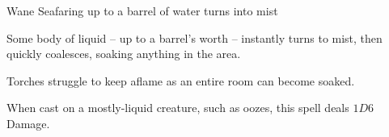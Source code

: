   {\mWater}%
  {Wane}%
  {}%
  {Seafaring}%
  {up to a barrel of water turns into mist}%
  {
    Some body of liquid -- up to a barrel's worth -- instantly turns to mist, then quickly coalesces, soaking anything in the area.

    Torches struggle to keep aflame as an entire room can become soaked.

    When cast on a mostly-liquid creature, such as oozes, this spell deals $1D6$ Damage.
  }

